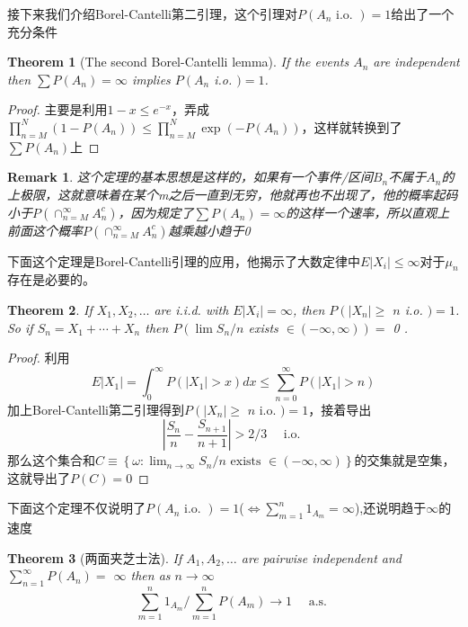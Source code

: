 \documentclass{article}
\newtheorem{theorem}{Theorem}[section]
\newtheorem*{proof}{Proof}
\newtheorem{remark}{Remark}[theorem]
\begin{document}
\par 接下来我们介绍Borel-Cantelli第二引理，这个引理对$P\left(A_n \text { i.o. }\right)=1$给出了一个充分条件
\begin{theorem}[The second Borel-Cantelli lemma]
	If the events $A_n$ are independent then $\sum P\left(A_n\right)=\infty$ implies $P\left(A_n\right.$ i.o. $)=1$.
\end{theorem}
\begin{proof}
	主要是利用$1-x\leq e^{-x}$，弄成$\prod_{n=M}^N\left(1-P\left(A_n\right)\right) \leq \prod_{n=M}^N \exp \left(-P\left(A_n\right)\right)$，这样就转换到了$\sum P(A_n)$上
\end{proof}
\begin{remark}
	这个定理的基本思想是这样的，如果有一个事件/区间$B_n$不属于$A_n$的上极限，这就意味着在某个m之后一直到无穷，他就再也不出现了，他的概率起码小于$P\left(\cap_{n=M}^\infty A_n^c\right)$，因为规定了$\sum P\left(A_n\right)=\infty$的这样一个速率，所以直观上前面这个概率$P\left(\cap_{n=M}^\infty A_n^c\right)$越乘越小趋于0
\end{remark}
\par 下面这个定理是Borel-Cantelli引理的应用，他揭示了大数定律中$E\left|X_i\right|\leq\infty$对于$\mu_n$存在是必要的。
\begin{theorem}
	 If $X_1, X_2, \ldots$ are i.i.d. with $E\left|X_i\right|=\infty$, then $P\left(\left|X_n\right| \geq\right.$ $n$ i.o. $)=1$. So if $S_n=X_1+\cdots+X_n$ then $P\left(\lim S_n / n\right.$ exists $\left.\in(-\infty, \infty)\right)=$ 0 .
\end{theorem}
\begin{proof}
	利用
	$$
	E\left|X_1\right|=\int_0^{\infty} P\left(\left|X_1\right|>x\right) d x \leq \sum_{n=0}^{\infty} P\left(\left|X_1\right|>n\right)
	$$
	加上Borel-Cantelli第二引理得到$P\left(\left|X_n\right| \geq\right.$ $n$ i.o. $)=1$，接着导出
	$$
	\left|\frac{S_n}{n}-\frac{S_{n+1}}{n+1}\right|>2 / 3 \quad \text { i.o. }
	$$
	那么这个集合和$C \equiv\left\{\omega: \lim _{n \rightarrow \infty} S_n / n \text { exists } \in(-\infty, \infty)\right\}$的交集就是空集，这就导出了$P(C)=0$
\end{proof}
下面这个定理不仅说明了$P\left(A_n \text { i.o. }\right)=1$($\Leftrightarrow \sum_{m=1}^n 1_{A_m}=\infty$),还说明趋于$\infty$的速度
\begin{theorem}[两面夹芝士法]
	 If $A_1, A_2, \ldots$ are pairwise independent and $\sum_{n=1}^{\infty} P\left(A_n\right)=$ $\infty$ then as $n \rightarrow \infty$
	$$
	\sum_{m=1}^n 1_{A_m} / \sum_{m=1}^n P\left(A_m\right) \rightarrow 1 \quad \text { a.s. }
	$$
\end{theorem}
\end{document}
